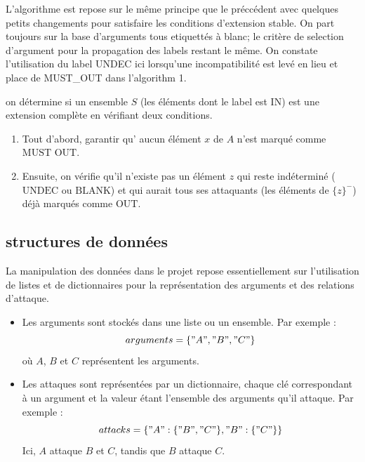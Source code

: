 \documentclass{rapportECL}
\begin{document}
\begin{itemize}
 L'algorithme est repose sur le même principe que le préccédent avec quelques petits changements pour satisfaire les conditions d'extension stable.
 On part toujours sur la base d'arguments tous etiquettés à blanc;  le critère de selection d'argument pour la propagation des labels restant le même.
 On constate l'utilisation du label UNDEC ici lorsqu'une incompatibilité est levé en lieu et place de MUST\_OUT dans l'algorithm 1.
 
 on détermine si un ensemble \( S \) (les éléments dont le label est \( \text{IN} \)) est une extension complète en vérifiant 
 deux conditions. 

 	\begin{enumerate}
		\item Tout d'abord, garantir qu' aucun élément \( x \) de \( A \) n'est marqué 
		comme \( \text{MUST OUT} \).
		\item Ensuite, on vérifie qu'il n'existe pas un élément \( z \) 
		qui reste indéterminé (\( \text{UNDEC} \) ou \( \text{BLANK} \)) et qui aurait tous ses attaquants (les éléments de \( \{z\}^- \)) déjà marqués comme \( \text{OUT} \).
	\end{enumerate}

\end{itemize}

\newpage

\subsection{structures de données}

La manipulation des données dans le projet repose essentiellement sur l’utilisation de listes et de dictionnaires pour la représentation des arguments et des relations d’attaque.

\begin{itemize}
    \item Les arguments sont stockés dans une liste ou un ensemble. Par exemple : 
    \[
    {arguments = \{"A", "B", "C"\}}
    \]
    où \( A \), \( B \) et \( C \) représentent les arguments.

    \item Les attaques sont représentées par un dictionnaire, chaque clé correspondant à un argument et la valeur étant l’ensemble des arguments qu’il attaque. Par exemple :
    \[
    {attacks = \{"A": \{"B", "C"\}, "B": \{"C"\}\}}
    \]
    Ici, \( A \) attaque \( B \) et \( C \), tandis que \( B \) attaque \( C \).
\end{itemize}
\end{document}

